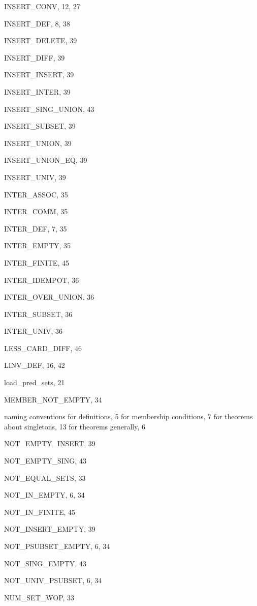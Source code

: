 \begin{theindex}
  \item {\ptt INSERT\_CONV}, 12, 27
  \item {\ptt INSERT\_DEF}, 8, 38
  \item {\ptt INSERT\_DELETE}, 39
  \item {\ptt INSERT\_DIFF}, 39
  \item {\ptt INSERT\_INSERT}, 39
  \item {\ptt INSERT\_INTER}, 39
  \item {\ptt INSERT\_SING\_UNION}, 43
  \item {\ptt INSERT\_SUBSET}, 39
  \item {\ptt INSERT\_UNION}, 39
  \item {\ptt INSERT\_UNION\_EQ}, 39
  \item {\ptt INSERT\_UNIV}, 39
  \item {\ptt INTER\_ASSOC}, 35
  \item {\ptt INTER\_COMM}, 35
  \item {\ptt INTER\_DEF}, 7, 35
  \item {\ptt INTER\_EMPTY}, 35
  \item {\ptt INTER\_FINITE}, 45
  \item {\ptt INTER\_IDEMPOT}, 36
  \item {\ptt INTER\_OVER\_UNION}, 36
  \item {\ptt INTER\_SUBSET}, 36
  \item {\ptt INTER\_UNIV}, 36

  \indexspace

  \item {\ptt LESS\_CARD\_DIFF}, 46
  \item {\ptt LINV\_DEF}, 16, 42
  \item {\ptt load\_pred\_sets}, 21

  \indexspace

  \item {\ptt MEMBER\_NOT\_EMPTY}, 34

  \indexspace

  \item naming conventions
    \subitem for definitions, 5
    \subitem for membership conditions, 7
    \subitem for theorems about singletons, 13
    \subitem for theorems generally, 6
  \item {\ptt NOT\_EMPTY\_INSERT}, 39
  \item {\ptt NOT\_EMPTY\_SING}, 43
  \item {\ptt NOT\_EQUAL\_SETS}, 33
  \item {\ptt NOT\_IN\_EMPTY}, 6, 34
  \item {\ptt NOT\_IN\_FINITE}, 45
  \item {\ptt NOT\_INSERT\_EMPTY}, 39
  \item {\ptt NOT\_PSUBSET\_EMPTY}, 6, 34
  \item {\ptt NOT\_SING\_EMPTY}, 43
  \item {\ptt NOT\_UNIV\_PSUBSET}, 6, 34
  \item {\ptt NUM\_SET\_WOP}, 33


\end{theindex}
